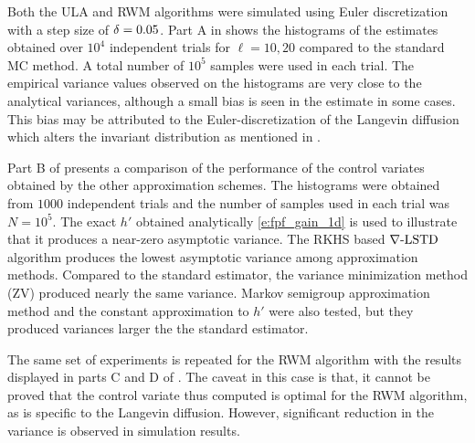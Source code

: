 Both the ULA and RWM algorithms were simulated using Euler discretization with a step size of $\delta = 0.05$. Part A in  shows the histograms of the estimates obtained over $10^4$ independent trials for $\ell= 10,20$ compared to the standard MC method. A total number of $10^5$ samples were used in each trial. The empirical variance values observed on the histograms are very close to the analytical variances, although a small bias is seen in the estimate in some cases. This bias may be attributed to the Euler-discretization of the Langevin diffusion which alters the invariant distribution as mentioned in \cite{robtwe96}.  %

Part B of  presents a comparison of the performance of the control variates obtained by the other approximation schemes. The histograms were obtained from $1000$ independent trials and the number of samples used in each trial was $N=10^5$. The exact $h'$ obtained analytically \eqref{e:fpf_gain_1d} is used to illustrate that it produces a near-zero asymptotic variance. The RKHS based $\nabla\text{-LSTD}$ algorithm produces the lowest asymptotic variance among approximation methods. Compared to the standard estimator, the variance minimization method (ZV) \cite{papmirgir14} produced nearly the same variance. Markov semigroup approximation method \cite{tagmeh16a} and the constant approximation to $h'$ were also tested, but they produced variances larger the the standard estimator.

The same set of experiments is repeated for the RWM algorithm with the results displayed in parts C and D of . The caveat in this case is that, it cannot be proved that the control variate thus computed is optimal for the RWM algorithm, as  is specific to the Langevin diffusion. However, significant reduction in the variance is observed in simulation results. %

